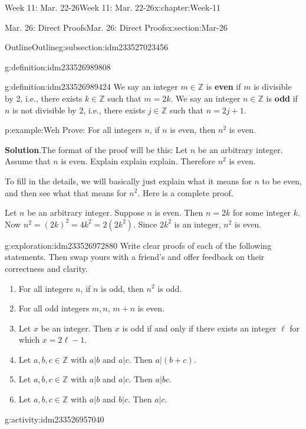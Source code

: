 \documentclass[oneside,10pt,]{book}
\newcommand{\blocktitlefont}{\relax}
\newcommand{\terminology}[1]{\textbf{#1}}
\numberwithin{equation}{section}
\def\Z{{\mathbb Z}}
\newcommand{\Z}{\mathbb Z}
\begin{document}
\begin{chapterptx}{Week 11: Mar. 22-26}{}{Week 11: Mar. 22-26}{}{}{x:chapter:Week-11}
\begin{sectionptx}{Mar. 26: Direct Proofs}{}{Mar. 26: Direct Proofs}{}{}{x:section:Mar-26}
\begin{subsectionptx}{Outline}{}{Outline}{}{}{g:subsection:idm233527023456}
\begin{definition}{}{g:definition:idm233526989808}
\end{definition}
\begin{definition}{}{g:definition:idm233526989424}%
We say an integer \(m\in\Z\) is \terminology{even} if \(m\) is divisible by 2, i.e., there exists \(k\in\Z\) such that \(m = 2k\). We say an integer \(n\in\Z\) is \terminology{odd} if \(n\) is not divisible by 2, i.e., there exists \(j\in\Z\) such that \(n = 2j+1\).%
\end{definition}
\begin{example}{}{p:example:Weh}%
Prove: For all integers \(n\), if \(n\) is even, then \(n^2\) is even.%
\par\smallskip%
\noindent\textbf{\blocktitlefont Solution}.\hypertarget{p:solution:EaD}{}\quad{}The format of the proof will be this: Let \(n\) be an arbitrary integer. Assume that \(n\) is even. Explain explain explain. Therefore \(n^2\) is even.%
\par
To fill in the details, we will basically just explain what it means for \(n\) to be even, and then see what that means for \(n^2\). Here is a complete proof.%
\begin{solutionproof}
Let \(n\) be an arbitrary integer. Suppose \(n\) is even. Then \(n = 2k\) for some integer \(k\). Now \(n^2 = (2k)^2 = 4k^2 = 2(2k^2)\). Since \(2k^2\) is an integer, \(n^2\) is even.%
\end{solutionproof}
\end{example}
\begin{exploration}{}{g:exploration:idm233526972880}%
Write clear proofs of each of the following statements. Then swap yours with a friend's and offer feedback on their correctness and clarity.%
%
\begin{enumerate}
\item{}For all integers \(n\), if \(n\) is odd, then \(n^2\) is odd.%
\item{}For all odd integers \(m,n\), \(m+n\) is even.%
\item{}Let \(x\) be an integer. Then \(x\) is odd if and only if there exists an integer \(\ell\) for which \(x = 2\ell -1\).%
\item{}Let \(a,b,c\in\Z\) with \(a|b\) and \(a|c\). Then \(a|(b+c)\).%
\item{}Let \(a,b,c\in\Z\) with \(a|b\) and \(a|c\). Then \(a|bc\).%
\item{}Let \(a,b,c\in\Z\) with \(a|b\) and \(b|c\). Then \(a|c\).%
\end{enumerate}
\end{exploration}%
\begin{activity}{}{g:activity:idm233526957040}%

\end{activity}
\end{subsectionptx}
\end{sectionptx}
\end{chapterptx}
\end{document}
